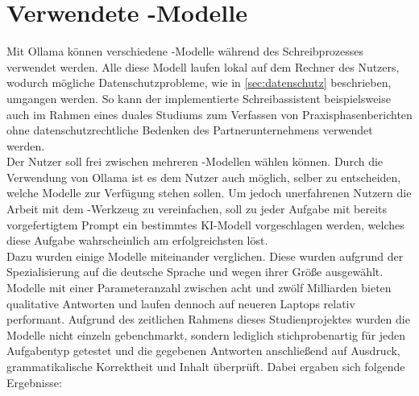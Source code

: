 \documentclass[../main.tex]{subfiles}
\begin{document}
\section{Verwendete -Modelle}
\label{sec:kiModelle}

Mit Ollama können verschiedene -Modelle während des Schreibprozesses verwendet werden. Alle diese Modell laufen lokal auf dem Rechner des Nutzers, wodurch mögliche Datenschutzprobleme, 
wie in \autoref{sec:datenschutz} beschrieben, umgangen werden. So kann der implementierte Schreibassistent beispielsweise auch im Rahmen eines duales Studiums zum Verfassen von 
Praxisphasenberichten ohne datenschutzrechtliche Bedenken des Partnerunternehmens verwendet werden.\\ 
Der Nutzer soll frei zwischen mehreren -Modellen wählen können. Durch die Verwendung von Ollama ist es dem Nutzer auch möglich, selber zu entscheiden, welche Modelle zur Verfügung 
stehen sollen. Um jedoch unerfahrenen Nutzern die Arbeit mit dem -Werkzeug zu vereinfachen, soll zu jeder Aufgabe mit bereits vorgefertigtem Prompt ein bestimmtes KI-Modell 
vorgeschlagen werden, welches diese Aufgabe wahrscheinlich am erfolgreichsten löst.\\ 
Dazu wurden einige Modelle miteinander verglichen. Diese wurden aufgrund der Spezialisierung auf die deutsche Sprache und wegen ihrer Größe ausgewählt. Modelle mit einer 
Parameteranzahl zwischen acht und zwölf Milliarden bieten qualitative Antworten und laufen dennoch auf neueren Laptops relativ performant. Aufgrund des zeitlichen Rahmens dieses 
Studienprojektes wurden die Modelle nicht einzeln gebenchmarkt, sondern lediglich stichprobenartig für jeden Aufgabentyp getestet und die gegebenen Antworten anschließend auf 
Ausdruck, grammatikalische Korrektheit und Inhalt überprüft. Dabei ergaben sich folgende Ergebnisse: 
\end{document}
